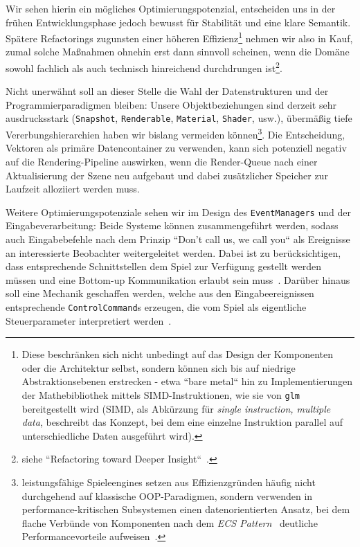 Wir sehen hierin ein mögliches Optimierungspotenzial, entscheiden uns in der frühen Entwicklungsphase jedoch bewusst für Stabilität und eine klare Semantik.
Spätere  Refactorings zugunsten einer höheren Effizienz\footnote{
Diese beschränken sich nicht unbedingt auf das Design der Komponenten oder die Architektur selbst, sondern können sich bis auf niedrige Abstraktionsebenen erstrecken - etwa ``bare metal`` hin zu Implementierungen der Mathebibliothek mittels SIMD-Instruktionen, wie sie von \texttt{glm}~\cite[]{glmSimd} bereitgestellt wird (SIMD, als Abkürzung für \textit{single instruction, multiple data}, beschreibt das Konzept, bei dem eine einzelne Instruktion parallel auf unterschiedliche Daten ausgeführt wird).
} nehmen wir also in Kauf, zumal solche Maßnahmen ohnehin erst dann sinnvoll scheinen, wenn die Domäne sowohl fachlich als auch technisch hinreichend durchdrungen ist\footnote{
   siehe ``Refactoring toward Deeper Insight``~\cite[]{Eva03}.
}.\par


Nicht unerwähnt soll an dieser Stelle die Wahl der Datenstrukturen und der Programmierparadigmen bleiben: Unsere Objektbeziehungen sind derzeit sehr ausdrucksstark (\texttt{Snapshot}, \texttt{Renderable}, \texttt{Material}, \texttt{Shader}, usw.), übermäßig tiefe Vererbungshierarchien haben wir bislang vermeiden können\footnote{
leistungsfähige Spieleengines setzen aus Effizienzgründen häufig nicht durchgehend auf klassische OOP-Paradigmen, sondern verwenden in performance-kritischen Subsystemen einen datenorientierten Ansatz, bei dem flache Verbünde von Komponenten nach dem \textit{ECS Pattern}~\cite[]{RCCK25} deutliche Performancevorteile aufweisen~\cite[]{WWM22}.
}.
Die Entscheidung, Vektoren als primäre Datencontainer zu verwenden, kann sich potenziell negativ auf die Rendering-Pipeline auswirken, wenn die Render-Queue nach einer Aktualisierung der Szene neu aufgebaut und dabei zusätzlicher Speicher zur Laufzeit alloziiert werden muss.\par

Weitere Optimierungspotenziale sehen wir im Design des \texttt{EventManagers} und der Eingabeverarbeitung: Beide Systeme können zusammengeführt werden, sodass auch Eingabebefehle nach dem Prinzip ``Don't call us, we call you`` als Ereignisse an interessierte Beobachter weitergeleitet werden.
Dabei ist zu berücksichtigen, dass entsprechende Schnittstellen dem Spiel zur Verfügung gestellt werden müssen und eine Bottom-up Kommunikation erlaubt sein muss~\cite[]{BMRS+96}.
Darüber hinaus soll eine Mechanik geschaffen werden, welche aus den Eingabeereignissen entsprechende \texttt{ControlCommand}s erzeugen, die vom Spiel als eigentliche  Steuerparameter interpretiert werden~\cite[21 ff.]{Nys14}.\par

